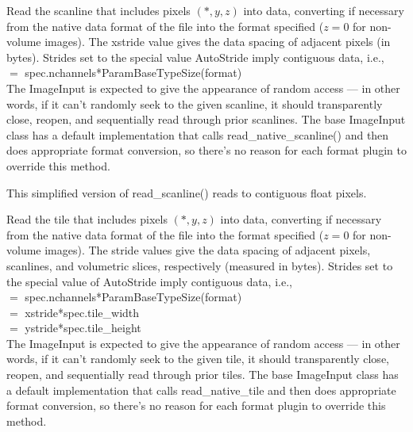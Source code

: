 
Read the scanline that includes pixels $(*,y,z)$ into {\kw data},
converting if necessary from the native data format of the file into the
{\kw format} specified ($z=0$ for non-volume images).  The {\kw xstride}
value gives the data spacing of adjacent pixels (in bytes).  Strides set
to the special value {\kw AutoStride} imply contiguous data, i.e., \\
   $=$ {\kw spec.nchannels*ParamBaseTypeSize(format)} \\
The {\kw ImageInput} is expected to give the appearance of random access
--- in other words, if it can't randomly seek to the given scanline, it
should transparently close, reopen, and sequentially read through prior
scanlines.  The base {\kw ImageInput} class has a default implementation
that calls {\kw read_native_scanline()} and then does appropriate format
conversion, so there's no reason for each format plugin to override this
method.
\apiend

This simplified version of {\kw read_scanline()} reads to contiguous 
float pixels.
\apiend

Read the tile that includes pixels $(*,y,z)$ into {\kw data}, converting
if necessary from the native data format of the file into the 
{\kw format} specified ($z=0$ for non-volume images).  The stride values
give the data spacing of adjacent pixels, scanlines, and volumetric
slices, respectively (measured in bytes).  Strides set to the special
value of {\kw AutoStride} imply contiguous data, i.e., \\
 $=$ {\kw spec.nchannels*ParamBaseTypeSize(format)} \\
 $=$ {\kw xstride*spec.tile_width} \\
 $=$ {\kw ystride*spec.tile_height} \\
The {\kw ImageInput} is expected to give the appearance of random access
--- in other words, if it can't randomly seek to the given tile, it
should transparently close, reopen, and sequentially read through prior
tiles.  The base {\kw ImageInput} class has a default implementation
that calls read_native_tile and then does appropriate format conversion,
so there's no reason for each format plugin to override this method.
\apiend


